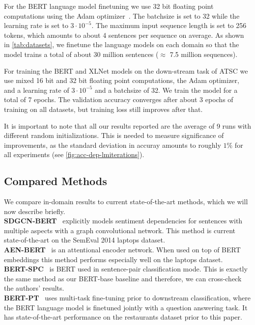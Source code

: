 \documentclass[11pt,a4paper]{article}
\newcommand{\rood}[1]{}
\begin{document}
For the BERT language model finetuning we use 32 bit floating point computations using the Adam optimizer~\cite{ArxKingma2014}. The batchsize is set to 32 while the learning rate is set to $3\cdot10^{-5}$. The maximum input sequence length is set to 256 tokens, which amounts to about 4 sentences per sequence on average.
As shown in \autoref{tab:datasets}, we finetune the language models on each domain so that the model trains a total of about 30 million sentences ($\approx$ 7.5 million sequences). 


For training the BERT and XLNet models on the down-stream task of ATSC we use mixed 16 bit and 32 bit floating point computations, the Adam optimizer, and a learning rate of $3\cdot10^{-5}$ and a batchsize of 32. We train the model for a total of 7 epochs. The validation accuracy converges after about 3 epochs of training on all datasets, but training loss still improves after that.

It is important to note that all our results reported are the average of 9 runs with different random initializations. This is needed to measure significance of improvements, as the standard deviation in accuray amounts to roughly $1\%$ for all experiments (see \autoref{fig:acc-dep-lmiterations}).

\subsection{Compared Methods}
\rood{Outcome: Readers have a short overview of the different models that are compared to our models}

We compare in-domain results to current state-of-the-art methods, which we will now describe briefly. \\
\textbf{SDGCN-BERT}~\cite{ArxZhaoa2019}
explicitly models sentiment dependencies for sentences with multiple aspects with a graph convolutional network. This method is current state-of-the-art on the SemEval 2014 laptops dataset. \\
\textbf{AEN-BERT}~\cite{ArxSong} is an attentional encoder network. When used on top of BERT embeddings this method performs especially well on the laptops dataset. \\
\textbf{BERT-SPC}~\cite{ArxSong}
is BERT used in sentence-pair classification mode. This is exactly the same method as our BERT-base baseline and therefore, we can cross-check the authors' results. \\
\textbf{BERT-PT}~\cite{Xu2019}
uses multi-task fine-tuning prior to downstream classification, where the 
BERT language model is finetuned jointly with a question answering task. It has state-of-the-art performance on the restaurants dataset prior to this paper.
\end{document}
